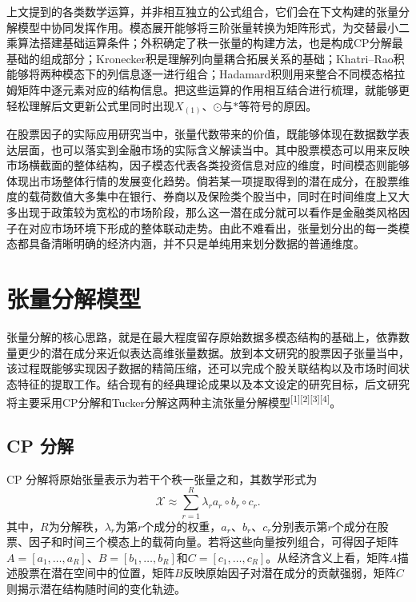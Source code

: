 上文提到的各类数学运算，并非相互独立的公式组合，它们会在下文构建的张量分解模型中协同发挥作用。模态展开能够将三阶张量转换为矩阵形式，为交替最小二乘算法搭建基础运算条件；外积确定了秩一张量的构建方法，也是构成CP分解最基础的组成部分；Kronecker积是理解列向量耦合拓展关系的基础；Khatri--Rao积能够将两种模态下的列信息逐一进行组合；Hadamard积则用来整合不同模态格拉姆矩阵中逐元素对应的结构信息。把这些运算的作用相互结合进行梳理，就能够更轻松理解后文更新公式里同时出现$X_{(1)}$、$\odot$与$\ast$等符号的原因。

在股票因子的实际应用研究当中，张量代数带来的价值，既能够体现在数据数学表达层面，也可以落实到金融市场的实际含义解读当中。其中股票模态可以用来反映市场横截面的整体结构，因子模态代表各类投资信息对应的维度，时间模态则能够体现出市场整体行情的发展变化趋势。倘若某一项提取得到的潜在成分，在股票维度的载荷数值大多集中在银行、券商以及保险类个股当中，同时在时间维度上又大多出现于政策较为宽松的市场阶段，那么这一潜在成分就可以看作是金融类风格因子在对应市场环境下形成的整体联动走势。由此不难看出，张量划分出的每一类模态都具备清晰明确的经济内涵，并不只是单纯用来划分数据的普通维度。

\section{张量分解模型}

张量分解的核心思路，就是在最大程度留存原始数据多模态结构的基础上，依靠数量更少的潜在成分来近似表达高维张量数据。放到本文研究的股票因子张量当中，该过程既能够实现因子数据的精简压缩，还可以完成个股关联结构以及市场时间状态特征的提取工作。结合现有的经典理论成果以及本文设定的研究目标，后文研究将主要采用CP分解和Tucker分解这两种主流张量分解模型\textsuperscript{[1][2][3][4]}。

\subsection{CP 分解}

CP 分解将原始张量表示为若干个秩一张量之和，其数学形式为
\begin{equation}
\mathcal{X}\approx \sum_{r=1}^{R}\lambda_r a_r\circ b_r\circ c_r.
\end{equation}
其中，$R$为分解秩，$\lambda_r$为第$r$个成分的权重，$a_r$、$b_r$、$c_r$分别表示第$r$个成分在股票、因子和时间三个模态上的载荷向量。若将这些向量按列组合，可得因子矩阵$A=[a_1,\ldots,a_R]$、$B=[b_1,\ldots,b_R]$和$C=[c_1,\ldots,c_R]$。从经济含义上看，矩阵$A$描述股票在潜在空间中的位置，矩阵$B$反映原始因子对潜在成分的贡献强弱，矩阵$C$则揭示潜在结构随时间的变化轨迹。

